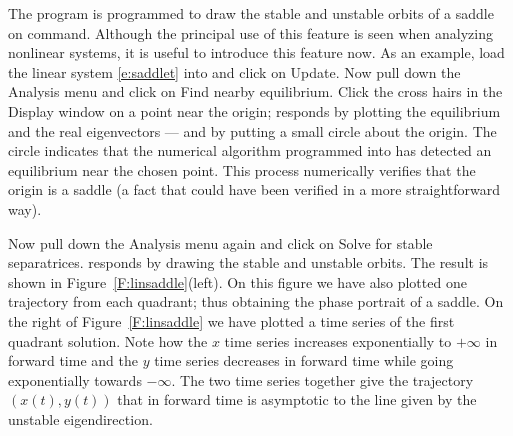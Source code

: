 \documentclass{ximera}
\begin{document}
The program {\pplane} is programmed to draw the stable and unstable
orbits of a saddle on command. Although the principal use of this
feature is seen when analyzing nonlinear systems, it is useful to
introduce this feature now.  As an example, load the linear system
\eqref{e:saddlet} into {\pplane} and click on {\sf Update}.  Now
pull down the {\sf Analysis} menu and click on {\sf Find nearby
equilibrium}.  Click the cross hairs in the {\sf \PPLANE\; Display}
window on a point near the origin; {\pplane} responds by
plotting the equilibrium and the real eigenvectors --- and by putting 
a small circle about the origin.  The circle indicates that the numerical algorithm
programmed into {\pplane} has detected an equilibrium near
the chosen point.  This process numerically verifies that the origin
is a saddle (a fact that could have been verified in a more
straightforward way).

Now pull down the {\sf Analysis} menu again and click on
{\sf Solve for stable separatrices}.  {\sf \pplane} responds by 
drawing the stable and unstable orbits.
The result is shown in Figure~\ref{F:linsaddle}(left).
On this figure we have also plotted one trajectory
from each quadrant; thus obtaining the phase portrait of a saddle.
On the right of Figure~\ref{F:linsaddle} we have plotted a
time series of the first quadrant solution.  Note how the $x$
time series increases exponentially to $+\infty$ in forward time and 
the $y$ time series decreases in forward time while going exponentially 
towards $-\infty$.  The two time series together
give the trajectory $(x(t),y(t))$ that in forward time is asymptotic
to the line given by the unstable eigendirection.





\end{document}
